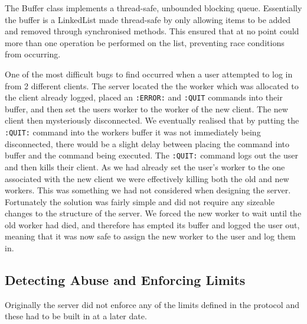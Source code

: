The Buffer class implements a thread-safe, unbounded blocking queue. Essentially the buffer is a LinkedList made thread-safe by only allowing items to be added and removed through synchronised methods. This ensured that at no point could more than one operation be performed on the list, preventing race conditions from occurring.

One of the most difficult bugs to find occurred when a user attempted to log in from 2 different clients. The server located the the worker which was allocated to the client already logged, placed an \texttt{:ERROR:} and \texttt{:QUIT} commands into their buffer, and then set the users worker to the worker of the new client. The new client then mysteriously disconnected. We eventually realised that by putting the \texttt{:QUIT:} command into the workers buffer it was not immediately being disconnected, there would be a slight delay between placing the command into buffer and the command being executed. The \texttt{:QUIT:} command logs out the user and then kills their client. As we had already set the user's worker to the one associated with the new client we were effectively killing both the old and new workers. This was something we had not considered when designing the server. Fortunately the solution was fairly simple and did not require any sizeable changes to the structure of the server. We forced the new worker to wait until the old worker had died, and therefore has empted its buffer and logged the user out, meaning that it was now safe to assign the new worker to the user and log them in.

\subsection{Detecting Abuse and Enforcing Limits}
Originally the server did not enforce any of the limits defined in the protocol and these had to be built in at a later date.
